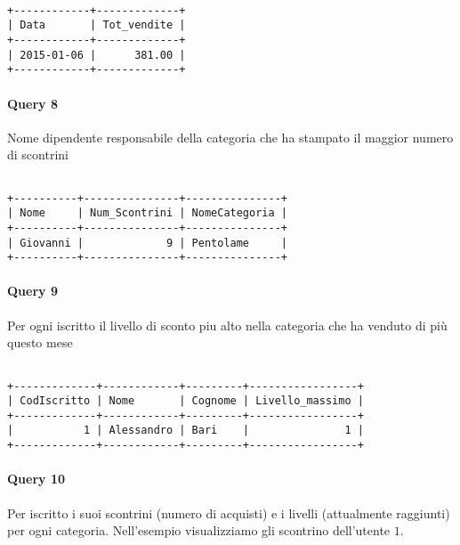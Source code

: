 \begin{verbatim}

+------------+-------------+
| Data       | Tot_vendite |
+------------+-------------+
| 2015-01-06 |      381.00 |
+------------+-------------+

\end{verbatim}



\paragraph*{Query 8}
Nome dipendente responsabile della categoria che ha stampato il maggior numero di scontrini

\begin{verbatim}

+----------+---------------+---------------+
| Nome     | Num_Scontrini | NomeCategoria |
+----------+---------------+---------------+
| Giovanni |             9 | Pentolame     |
+----------+---------------+---------------+

\end{verbatim}



\paragraph*{Query 9}
Per ogni iscritto il livello di sconto piu alto nella categoria che ha venduto di pi\`u questo mese

\begin{verbatim}

+-------------+------------+---------+-----------------+
| CodIscritto | Nome       | Cognome | Livello_massimo |
+-------------+------------+---------+-----------------+
|           1 | Alessandro | Bari    |               1 |
+-------------+------------+---------+-----------------+

\end{verbatim}



\newpage
\paragraph*{Query 10}
Per iscritto i suoi scontrini (numero di acquisti) e i livelli (attualmente raggiunti) per ogni categoria.
Nell'esempio visualizziamo gli scontrino dell'utente $1$.

